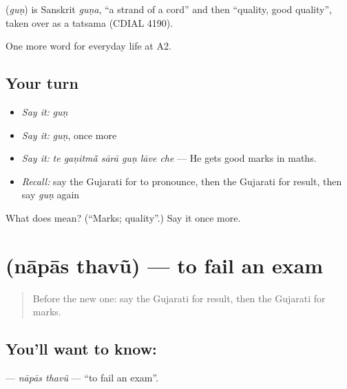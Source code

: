 \begin{cousinweb}
\textbf{} (\emph{guṇ}) is Sanskrit \emph{guṇa}, \textquotedblleft{}a strand of a cord\textquotedblright{} and then \textquotedblleft{}quality, good quality\textquotedblright{}, taken over as a tatsama (CDIAL 4190).
\end{cousinweb}

\begin{grammarlens}[title={What you've built}]
One more word for everyday life at A2.
\end{grammarlens}

\subsection*{Your turn}
\begin{itemize}
\raggedright
  \item \emph{Say it:} \emph{guṇ}
  \item \emph{Say it:} \emph{guṇ}, once more
  \item \emph{Say it:} \emph{te gaṇitmā̃ sārā guṇ lāve che} — He gets good marks in maths.
  \item \emph{Recall:} say the Gujarati for to pronounce, then the Gujarati for result, then say \emph{guṇ} again
\end{itemize}

\begin{tcolorbox}[breakable,colback=teal!4,colframe=teal!35!black,title={Before you move on}]
What does  mean? (\textquotedblleft{}Marks; quality\textquotedblright{}.) Say it once more.
\end{tcolorbox}
\section[\texorpdfstring{\gu{નાપાસ} \gu{થવું} (nāpās thavũ)}{નાપાસ થવું (nāpās thavũ)}]{  (nāpās thavũ) — to fail an exam}

\label{lesson:GU-C246-napas-thavu}



\begin{quote}
Before the new one: say the Gujarati for result, then the Gujarati for marks.
\end{quote}

\subsection*{You'll want to know:  }
\textbf{ } — \emph{nāpās thavũ} — \textquotedblleft{}to fail an exam\textquotedblright{}.

